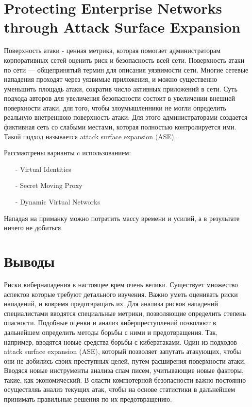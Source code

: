 \documentclass[11pt, a4paper]{article}		%
\begin{document}

\section{Protecting Enterprise Networks through Attack Surface Expansion}

Поверхность атаки - ценная метрика, которая помогает администраторам корпоративных сетей оценить риск и безопасность всей сети. Поверхность атаки по сети — общепринятый термин для описания уязвимости сети. Многие сетевые нападения проходят через уязвимые приложения, и можно существенно уменьшить площадь атаки, сократив число активных приложений в сети. Суть подхода авторов для увеличения безопасности состоит в увеличении внешней поверхности атаки, для того, чтобы злоумышленники не могли определить реальную внетреннюю поверхность атаки. Для этого администраторами создается фиктивная сеть со слабыми местами, которая полностью контролируется ими. Такой подход называется attack surface expansion (ASE).

Рассмаотрены варианты c использованием:

\begin{itemize}

\item[-] Virtual Identities 

\item[-] Secret Moving Proxy

\item[-] Dynamic Virtual Networks

\end{itemize}

Нападая на приманку можно потратить массу времени и усилий, а в результате ничего не добиться.



\section{Выводы}

Риски кибернападения в настоящее врем очень велики. Существует множество аспектов которые требуют детального изучения. Важно уметь оценивать риски нападений, и вовремя предотвращать их. Для анализа рисков нападений специалистами вводятся специальные метрики, позволяющие определить степень опасности. Подобные оценки и анализ киберпреступлений позволяют в дальнейшем определить методы борьбы с ними и предотвращения. Так, например, вводятся новые средства борьбы с кибератаками. Один из подходов - attack surface expansion (ASE), который позволяет запутать атакующих, чтобы они не добились своих преступных целей, путем расширения поверхности атаки. Вводяся новые инструменты анализа спам писем, учитывающие новые факторы, такие, как экономический. В оласти компютерной безопасности важно постоянно осуществляь анализ текущих атак, чтобы на основе статистики в дальнейшем принимать правильные решения по их предотвращению. 
\end{document}
